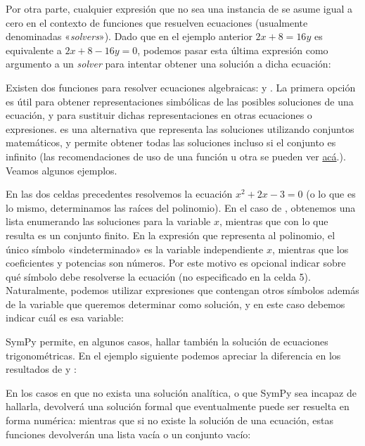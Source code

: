 Por otra parte, cualquier expresión que no sea una instancia de  se asume igual a cero en el contexto de funciones que resuelven ecuaciones (usualmente denominadas «\textit{solvers}»). Dado que en el ejemplo anterior $2 x + 8 = 16 y$ es equivalente a $2 x + 8 - 16 y = 0$, podemos pasar esta última expresión como argumento a un \textit{solver} para intentar obtener una solución a dicha ecuación:

Existen dos funciones para resolver ecuaciones algebraicas:  y . La primera opción es útil para obtener representaciones simbólicas de las posibles soluciones de una ecuación, y para sustituir dichas representaciones en otras ecuaciones o expresiones.  es una alternativa que representa las soluciones utilizando conjuntos matemáticos, y permite obtener todas las soluciones incluso si el conjunto es infinito (las recomendaciones de uso de una función u otra se pueden ver \href{https://docs.sympy.org/latest/guides/solving/solve-equation-algebraically.html}{acá}.). Veamos algunos ejemplos.

En las dos celdas precedentes resolvemos la ecuación $x^2 + 2 x - 3 = 0$ (o lo que es lo mismo, determinamos las raíces del polinomio). En el caso de , obtenemos una lista enumerando las soluciones para la variable $x$, mientras que con  lo que resulta es un conjunto finito. En la expresión que representa al polinomio, el único símbolo «indeterminado» es la variable independiente $x$, mientras que los coeficientes y potencias son números. Por este motivo es opcional indicar sobre qué símbolo debe resolverse la ecuación (no especificado en la celda 5). Naturalmente, podemos utilizar expresiones que contengan otros símbolos además de la variable que queremos determinar como solución, y en este caso debemos indicar cuál es esa variable:

SymPy permite, en algunos casos, hallar también la solución de ecuaciones trigonométricas. En el ejemplo siguiente podemos apreciar la diferencia en los resultados de  y :

En los casos en que no exista una solución analítica, o que SymPy sea incapaz de hallarla, devolverá una solución formal que eventualmente puede ser resuelta en forma numérica:
\noindent mientras que si no existe la solución de una ecuación, estas funciones devolverán una lista vacía o un conjunto vacío:

